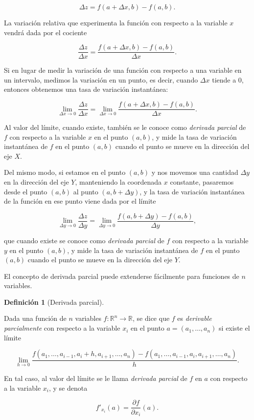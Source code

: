 \documentclass[
  a4paper,
]{scrreport}
\theoremstyle{definition}
\newtheorem{definition}{Definición}[chapter]
\theoremstyle{plain}
\theoremstyle{plain}
\theoremstyle{definition}
\theoremstyle{definition}
\theoremstyle{plain}
\theoremstyle{remark}
\begin{document}
\[
\Delta z=f(a+\Delta x,b)-f(a,b).
\]

La variación relativa que experimenta la función con respecto a la
variable \(x\) vendrá dada por el cociente

\[
\frac{\Delta z}{\Delta x}=\frac{f(a+\Delta x,b)-f(a,b)}{\Delta x}.
\]

Si en lugar de medir la variación de una función con respecto a una
variable en un intervalo, medimos la variación en un punto, es decir,
cuando \(\Delta x\) tiende a 0, entonces obtenemos una tasa de variación
instantánea:

\[
\lim_{\Delta x\rightarrow 0}\frac{\Delta z}{\Delta x}=\lim_{\Delta x \rightarrow 0}\frac{f(a+\Delta x,b)-f(a,b)}{\Delta x}.
\]

Al valor del límite, cuando existe, también se le conoce como
\emph{derivada parcial} de \(f\) con respecto a la variable \(x\) en el
punto \((a,b)\), y mide la tasa de variación instantánea de \(f\) en el
punto \((a,b)\) cuando el punto se mueve en la dirección del eje \(X\).

Del mismo modo, si estamos en el punto \((a,b)\) y nos movemos una
cantidad \(\Delta y\) en la dirección del eje \(Y\), manteniendo la
coordenada \(x\) constante, pasaremos desde el punto \((a,b)\) al punto
\((a,b+\Delta y)\), y la tasa de variación instantánea de la función en
ese punto viene dada por el límite

\[
\lim_{\Delta y\rightarrow 0}\frac{\Delta z}{\Delta y}=\lim_{\Delta y \rightarrow 0}\frac{f(a,b+\Delta y)-f(a,b)}{\Delta y},
\]

que cuando existe se conoce como \emph{derivada parcial} de \(f\) con
respecto a la variable \(y\) en el punto \((a,b)\), y mide la tasa de
variación instantánea de \(f\) en el punto \((a,b)\) cuando el punto se
mueve en la dirección del eje \(Y\).

El concepto de derivada parcial puede extenderse fácilmente para
funciones de \(n\) variables.

\begin{definition}[Derivada
parcial]\protect\hypertarget{def-derivada-parcial}{}\label{def-derivada-parcial}

Dada una función de \(n\) variables
\(f:\mathbb{R}^n\rightarrow \mathbb{R}\), se dice que \(f\) es
\emph{derivable parcialmente} con respecto a la variable \(x_i\) en el
punto \(a=(a_1,\ldots,a_n)\) si existe el límite

\[
\lim_{h\rightarrow 0} \frac{f(a_1,\ldots,a_{i-1},a_i+h,a_{i+1},\ldots,a_n)-f(a_1,\ldots,a_{i-1},a_i,a_{i+1},\ldots,a_n)} {h}.
\]

En tal caso, al valor del límite se le llama \emph{derivada parcial} de
\(f\) en \(a\) con respecto a la variable \(x_i\), y se denota

\[
f'_{x_i}(a)=\frac{\partial f}{\partial x_i}(a).
\]

\end{definition}
\end{document}
